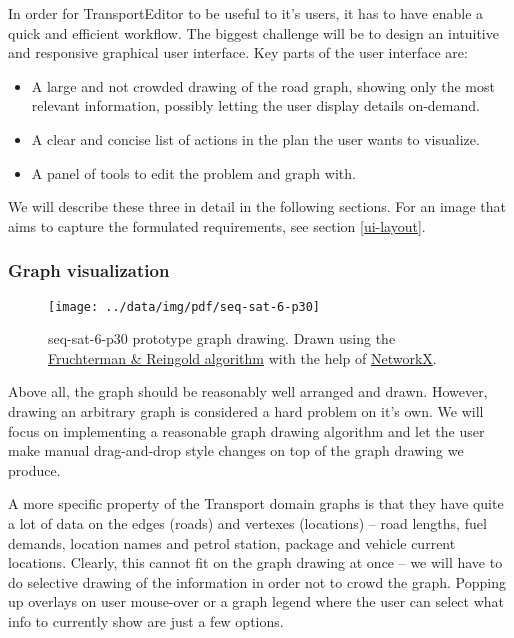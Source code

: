 \documentclass[10pt,a4paper,oneside]{article}
\newcommand{\pname}{TransportEditor} %
\begin{document}
In order for \pname{} to be useful to it's users, it has to have enable a quick and efficient workflow.
The biggest challenge will be to design an intuitive and responsive graphical user interface.
Key parts of the user interface are:
\begin{itemize}
\item A large and not crowded drawing of the road graph, showing only the most relevant information, possibly letting the user display details on-demand.
\item A clear and concise list of actions in the plan the user wants to visualize.
\item A panel of tools to edit the problem and graph with.
\end{itemize}

We will describe these three in detail in the following sections. For an image that aims to capture the formulated requirements, see section \ref{ui-layout}.

\subsubsection{Graph visualization} \label{graphviz}

\begin{wrapfigure}{r}{0.5\textwidth}
        \texttt{[image: ../data/img/pdf/seq-sat-6-p30]}
        \caption{seq-sat-6-p30 prototype graph drawing. Drawn using the
         \href{http://emr.cs.iit.edu/~reingold/force-directed.pdf}{Fruchterman \& Reingold algorithm}
         with the help of  \href{https://networkx.github.io/}{NetworkX}.}
        \label{fig:graph}
\end{wrapfigure}

Above all, the graph should be reasonably well arranged and drawn. However, drawing an arbitrary graph is considered a hard problem on it's own.
We will focus on implementing a reasonable graph drawing algorithm and let the user make manual drag-and-drop style changes on top of the graph drawing we produce.

A more specific property of the Transport domain graphs is that they have quite a lot of data on the edges (roads) and vertexes (locations) -- road lengths, fuel demands, location names and petrol station, package and vehicle current locations.
Clearly, this cannot fit on the graph drawing at once -- we will have to do selective drawing of the information in order
not to crowd the graph.
Popping up overlays on user mouse-over
or a graph legend where the user can select what info to currently show are just a few options.
\end{document}
